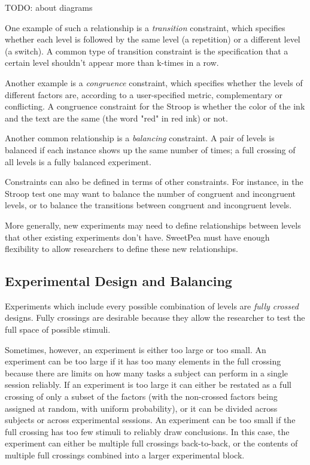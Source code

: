TODO: about diagrams

One example of such a relationship is a \emph{transition} constraint, which specifies whether each level is followed by the same level (a repetition) or a different level (a switch). A common type of transition constraint is the specification that a certain level shouldn't appear more than k-times in a row.

Another example is a \emph{congruence} constraint, which specifies whether the levels of different factors are, according to a user-specified metric, complementary or conflicting. A congruence constraint for the Stroop is whether the color of the ink and the text are the same (the word "red" in red ink) or not.

Another common relationship is a \emph{balancing} constraint. A pair of levels is balanced if each instance shows up the same number of times; a full crossing of all levels is a fully balanced experiment.

Constraints can also be defined in terms of other constraints. For instance, in the Stroop test one may want to balance the number of congruent and incongruent levels, or to balance the transitions between congruent and incongruent levels.

More generally, new experiments may need to define relationships between levels that other existing experiments don't have. SweetPea must have enough flexibility to allow researchers to define these new relationships.

\subsection{Experimental Design and Balancing}

Experiments which include every possible combination of levels are \emph{fully crossed} designs. Fully crossings are desirable because they allow the researcher to test the full space of possible stimuli.

Sometimes, however, an experiment is either too large or too small. An experiment can be too large if it has too many elements in the full crossing because there are limits on how many tasks a subject can perform in a single session reliably. If an experiment is too large it can either be restated as a full crossing of only a subset of the factors (with the non-crossed factors being assigned at random, with uniform probability), or it can be divided across subjects or across experimental sessions. An experiment can be too small if the full crossing has too few stimuli to reliably draw conclusions. In this case, the experiment can either be multiple full crossings back-to-back, or the contents of multiple full crossings combined into a larger experimental block.

